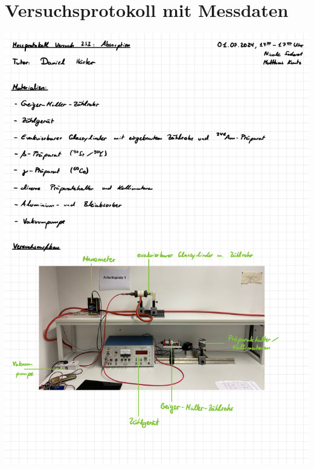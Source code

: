 \documentclass{article}
\begin{document}
\section{Versuchsprotokoll mit Messdaten}

\includegraphics[width=\textwidth]{graphics/mess1.jpg}
\newpage
\end{document}
